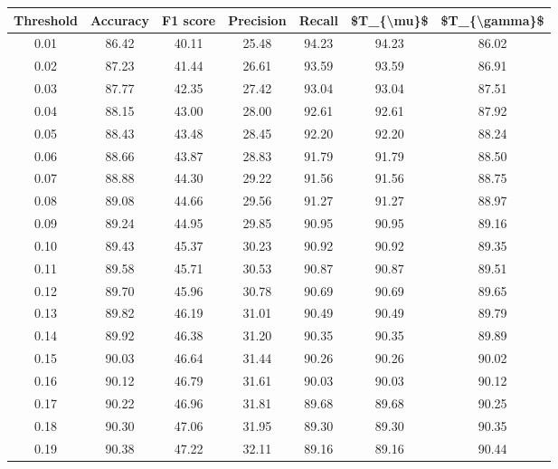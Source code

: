 \begin{tabular}{|c|c|c|c|c|c|c|}
\hline
 Threshold &  Accuracy &  F1 score &  Precision &  Recall &  \$T\_\{\textbackslash mu\}\$ &  \$T\_\{\textbackslash gamma\}\$ \\
\hline
      0.01 &     86.42 &     40.11 &      25.48 &   94.23 &      94.23 &         86.02 \\
      0.02 &     87.23 &     41.44 &      26.61 &   93.59 &      93.59 &         86.91 \\
      0.03 &     87.77 &     42.35 &      27.42 &   93.04 &      93.04 &         87.51 \\
      0.04 &     88.15 &     43.00 &      28.00 &   92.61 &      92.61 &         87.92 \\
      0.05 &     88.43 &     43.48 &      28.45 &   92.20 &      92.20 &         88.24 \\
      0.06 &     88.66 &     43.87 &      28.83 &   91.79 &      91.79 &         88.50 \\
      0.07 &     88.88 &     44.30 &      29.22 &   91.56 &      91.56 &         88.75 \\
      0.08 &     89.08 &     44.66 &      29.56 &   91.27 &      91.27 &         88.97 \\
      0.09 &     89.24 &     44.95 &      29.85 &   90.95 &      90.95 &         89.16 \\
      0.10 &     89.43 &     45.37 &      30.23 &   90.92 &      90.92 &         89.35 \\
      0.11 &     89.58 &     45.71 &      30.53 &   90.87 &      90.87 &         89.51 \\
      0.12 &     89.70 &     45.96 &      30.78 &   90.69 &      90.69 &         89.65 \\
      0.13 &     89.82 &     46.19 &      31.01 &   90.49 &      90.49 &         89.79 \\
      0.14 &     89.92 &     46.38 &      31.20 &   90.35 &      90.35 &         89.89 \\
      0.15 &     90.03 &     46.64 &      31.44 &   90.26 &      90.26 &         90.02 \\
      0.16 &     90.12 &     46.79 &      31.61 &   90.03 &      90.03 &         90.12 \\
      0.17 &     90.22 &     46.96 &      31.81 &   89.68 &      89.68 &         90.25 \\
      0.18 &     90.30 &     47.06 &      31.95 &   89.30 &      89.30 &         90.35 \\
      0.19 &     90.38 &     47.22 &      32.11 &   89.16 &      89.16 &         90.44 \\

\end{tabular}
